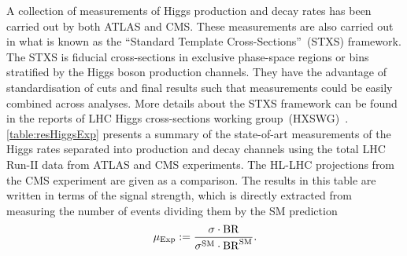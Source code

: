 A collection of measurements of Higgs production and decay rates has been carried out by both ATLAS and CMS. These measurements are also carried out in what is known as the ``Standard Template Cross-Sections''~(STXS) framework. The STXS is fiducial cross-sections in exclusive phase-space regions or bins stratified by the Higgs boson production channels. They have the advantage of standardisation of cuts and final results such that measurements could be easily combined across analyses. More details about the STXS framework can be found in the reports of  LHC Higgs cross-sections working group~(HXSWG)~\cite{Berger:2019wnu}.  \autoref{table:resHiggsExp} presents a summary of the state-of-art measurements of the Higgs rates separated into production and decay channels using the total LHC Run-II data from ATLAS and CMS experiments. The HL-LHC projections from the CMS experiment are given as a comparison. The results in this table are written in terms of the signal strength, which is directly extracted from measuring the number of events dividing them by the SM prediction
\begin{equation}
	\mu_{\mathrm{Exp}} := \frac{ \sigma \cdot \mathrm{BR}}{ \sigma^{\mathrm{SM}} \cdot \mathrm{BR}^{\mathrm{SM}}}.
\end{equation}
\newpage
\begingroup
 
\endgroup
\FloatBarrier
